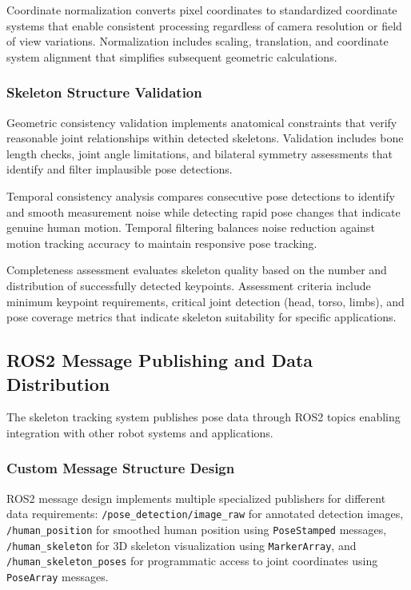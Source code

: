 Coordinate normalization converts pixel coordinates to standardized coordinate systems that enable consistent processing regardless of camera resolution or field of view variations. Normalization includes scaling, translation, and coordinate system alignment that simplifies subsequent geometric calculations.

\subsubsection{Skeleton Structure Validation}

Geometric consistency validation implements anatomical constraints that verify reasonable joint relationships within detected skeletons. Validation includes bone length checks, joint angle limitations, and bilateral symmetry assessments that identify and filter implausible pose detections.

Temporal consistency analysis compares consecutive pose detections to identify and smooth measurement noise while detecting rapid pose changes that indicate genuine human motion. Temporal filtering balances noise reduction against motion tracking accuracy to maintain responsive pose tracking.

Completeness assessment evaluates skeleton quality based on the number and distribution of successfully detected keypoints. Assessment criteria include minimum keypoint requirements, critical joint detection (head, torso, limbs), and pose coverage metrics that indicate skeleton suitability for specific applications.

\subsection{ROS2 Message Publishing and Data Distribution}

The skeleton tracking system publishes pose data through ROS2 topics enabling integration with other robot systems and applications.

\subsubsection{Custom Message Structure Design}

ROS2 message design implements multiple specialized publishers for different data requirements: \texttt{/pose\_detection/image\_raw} for annotated detection images, \texttt{/human\_position} for smoothed human position using \texttt{PoseStamped} messages, \texttt{/human\_skeleton} for 3D skeleton visualization using \texttt{MarkerArray}, and \texttt{/human\_skeleton\_poses} for programmatic access to joint coordinates using \texttt{PoseArray} messages.

